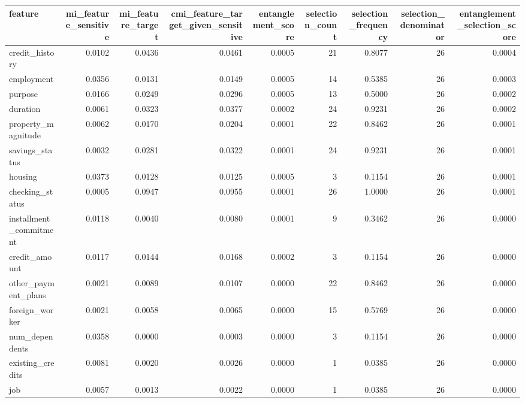 \begin{tabular}{lrrrrrrrr}
\toprule
feature & mi\_feature\_sensitive & mi\_feature\_target & cmi\_feature\_target\_given\_sensitive & entanglement\_score & selection\_count & selection\_frequency & selection\_denominator & entanglement\_selection\_score \\
\midrule
credit\_history & 0.0102 & 0.0436 & 0.0461 & 0.0005 & 21 & 0.8077 & 26 & 0.0004 \\
employment & 0.0356 & 0.0131 & 0.0149 & 0.0005 & 14 & 0.5385 & 26 & 0.0003 \\
purpose & 0.0166 & 0.0249 & 0.0296 & 0.0005 & 13 & 0.5000 & 26 & 0.0002 \\
duration & 0.0061 & 0.0323 & 0.0377 & 0.0002 & 24 & 0.9231 & 26 & 0.0002 \\
property\_magnitude & 0.0062 & 0.0170 & 0.0204 & 0.0001 & 22 & 0.8462 & 26 & 0.0001 \\
savings\_status & 0.0032 & 0.0281 & 0.0322 & 0.0001 & 24 & 0.9231 & 26 & 0.0001 \\
housing & 0.0373 & 0.0128 & 0.0125 & 0.0005 & 3 & 0.1154 & 26 & 0.0001 \\
checking\_status & 0.0005 & 0.0947 & 0.0955 & 0.0001 & 26 & 1.0000 & 26 & 0.0001 \\
installment\_commitment & 0.0118 & 0.0040 & 0.0080 & 0.0001 & 9 & 0.3462 & 26 & 0.0000 \\
credit\_amount & 0.0117 & 0.0144 & 0.0168 & 0.0002 & 3 & 0.1154 & 26 & 0.0000 \\
other\_payment\_plans & 0.0021 & 0.0089 & 0.0107 & 0.0000 & 22 & 0.8462 & 26 & 0.0000 \\
foreign\_worker & 0.0021 & 0.0058 & 0.0065 & 0.0000 & 15 & 0.5769 & 26 & 0.0000 \\
num\_dependents & 0.0358 & 0.0000 & 0.0003 & 0.0000 & 3 & 0.1154 & 26 & 0.0000 \\
existing\_credits & 0.0081 & 0.0020 & 0.0026 & 0.0000 & 1 & 0.0385 & 26 & 0.0000 \\
job & 0.0057 & 0.0013 & 0.0022 & 0.0000 & 1 & 0.0385 & 26 & 0.0000 \\
\bottomrule
\end{tabular}
